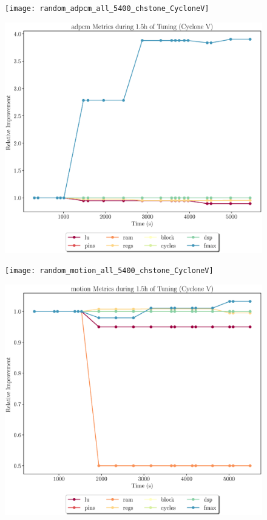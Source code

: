 \documentclass[12pt, a4paper]{article}
\begin{document}
\begin{figure}[htpb]
    \begin{minipage}{.48\textwidth}
        \texttt{[image: random\_adpcm\_all\_5400\_chstone\_CycloneV]}
    \end{minipage}%
    \hfill
    \begin{minipage}{.48\textwidth}
        \includegraphics[scale=.25]{adpcm_all_5400_chstone_CycloneV}
    \end{minipage}%

    \begin{minipage}{.48\textwidth}
        \texttt{[image: random\_motion\_all\_5400\_chstone\_CycloneV]}
    \end{minipage}%
    \hfill
    \begin{minipage}{.48\textwidth}
        \includegraphics[scale=.25]{motion_all_5400_chstone_CycloneV}
    \end{minipage}%
\end{figure}
\end{document}
